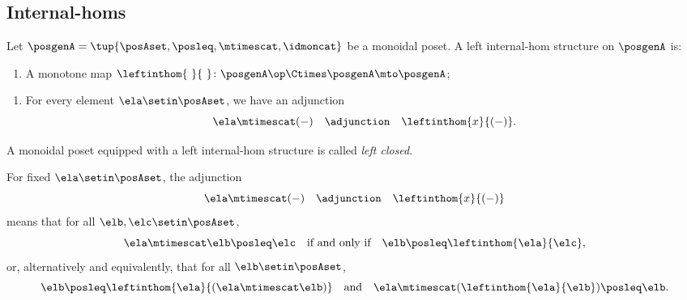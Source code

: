 \subsection{Internal-homs}

\begin{ctdefinition}
\label{def:left-internal-hom-monoidal-poset}
Let $\posgenA = \tup{\posAset, \posleq, \mtimescat, \idmoncat}$ be a monoidal poset. A left internal-hom structure on $\posgenA$ is:

\constit
\begin{enumerate}
\item A monotone map $\leftinthom{\ }{\ } \colon \posgenA\op \Ctimes \posgenA \mto \posgenA$; 
\end{enumerate}

\condit
\begin{enumerate}
\item For every element $\ela \setin \posAset$, we have an adjunction 
\begin{equation}
\ela \mtimescat ( - ) \quad  \adjunction \quad \leftinthom{x}{( - )}.
\end{equation}
\end{enumerate}
A monoidal poset equipped with a left internal-hom structure is called \emph{left closed}.
\end{ctdefinition}

\begin{remark}
\label{rem:left-internal-hom-unpacked}
For fixed $\ela \setin \posAset$, the adjunction 
\begin{equation}
\ela \mtimescat ( - ) \quad  \adjunction \quad \leftinthom{x}{( - )}
\end{equation}
means that for all $\elb, \elc \setin \posAset$,
\begin{equation}
\ela \mtimescat \elb \posleq \elc  \quad \text{if and only if} \quad \elb \posleq \leftinthom{\ela}{\elc},
\end{equation}
or, alternatively and equivalently, that for all $\elb \setin \posAset$,
\begin{equation}
\elb \posleq \leftinthom{\ela}{(\ela \mtimescat \elb)} \quad \text{and} \quad \ela \mtimescat (\leftinthom{\ela}{\elb}) \posleq \elb.
\end{equation}
\end{remark}


